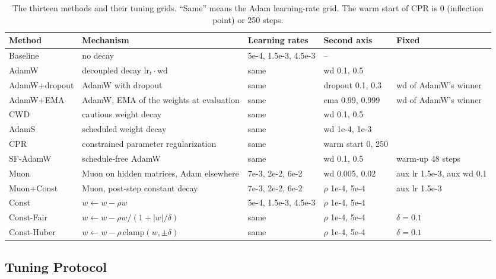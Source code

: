 \documentclass[twoside,11pt]{article}
\newcommand{\wdec}{\mathrm{wd}}
\begin{document}
\begin{table}[t]
\centering
\footnotesize
\setlength{\tabcolsep}{3.5pt}
\begin{tabular}{@{}l p{3.9cm} l l p{2.6cm}@{}}
\toprule
Method & Mechanism & Learning rates & Second axis & Fixed \\
\midrule
Baseline & no decay & 5e-4, 1.5e-3, 4.5e-3 & -- & \\
AdamW & decoupled decay $\mathrm{lr}_t \cdot \wdec$ & same & wd 0.1, 0.5 & \\
AdamW+dropout & AdamW with dropout & same & dropout 0.1, 0.3 & wd of AdamW's winner \\
AdamW+EMA & AdamW, EMA of the weights at evaluation & same & ema 0.99, 0.999 & wd of AdamW's winner \\
CWD & cautious weight decay & same & wd 0.1, 0.5 & \\
AdamS & scheduled weight decay & same & wd 1e-4, 1e-3 & \\
CPR & constrained parameter regularization & same & warm start 0, 250 & \\
SF-AdamW & schedule-free AdamW & same & wd 0.1, 0.5 & warm-up 48 steps \\
Muon & Muon on hidden matrices, Adam elsewhere & 7e-3, 2e-2, 6e-2 & wd 0.005, 0.02 & aux lr 1.5e-3, aux wd 0.1 \\
Muon+Const & Muon, post-step constant decay & 7e-3, 2e-2, 6e-2 & $\rho$ 1e-4, 5e-4 & aux lr 1.5e-3 \\
Const & $w \leftarrow w - \rho w$ & 5e-4, 1.5e-3, 4.5e-3 & $\rho$ 1e-4, 5e-4 & \\
Const-Fair & $w \leftarrow w - \rho w / (1 + |w|/\delta)$ & same & $\rho$ 1e-4, 5e-4 & $\delta = 0.1$ \\
Const-Huber & $w \leftarrow w - \rho\,\mathrm{clamp}(w, \pm\delta)$ & same & $\rho$ 1e-4, 5e-4 & $\delta = 0.1$ \\
\bottomrule
\end{tabular}
\caption{The thirteen methods and their tuning grids. ``Same'' means the Adam learning-rate grid. The warm start of CPR is 0 (inflection point) or 250 steps.}
\label{tab:methods}
\end{table}

\subsection{Tuning Protocol}
\end{document}
